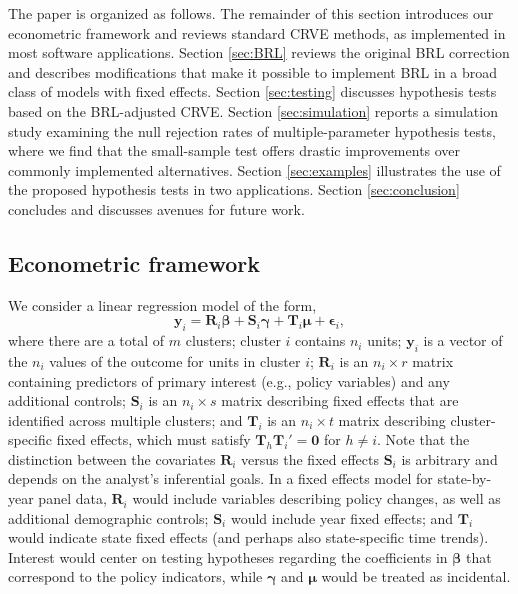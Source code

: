 \documentclass[12pt]{article}
\begin{document}
The paper is organized as follows. The remainder of this section
introduces our econometric framework and reviews standard CRVE methods,
as implemented in most software applications. Section \ref{sec:BRL}
reviews the original BRL correction and describes modifications that
make it possible to implement BRL in a broad class of models with fixed
effects. Section \ref{sec:testing} discusses hypothesis tests based on
the BRL-adjusted CRVE. Section \ref{sec:simulation} reports a simulation
study examining the null rejection rates of multiple-parameter
hypothesis tests, where we find that the small-sample test offers
drastic improvements over commonly implemented alternatives. Section
\ref{sec:examples} illustrates the use of the proposed hypothesis tests
in two applications. Section \ref{sec:conclusion} concludes and
discusses avenues for future work.

\hypertarget{econometric-framework}{%
\subsection{Econometric framework}\label{econometric-framework}}

We consider a linear regression model of the form, \begin{equation}
\label{eq:fixed_effects}
\mathbf{y}_i = \mathbf{R}_i \boldsymbol\beta + \mathbf{S}_i \boldsymbol\gamma + \mathbf{T}_i \boldsymbol\mu + \boldsymbol\epsilon_i,
\end{equation} where there are a total of \(m\) clusters; cluster \(i\)
contains \(n_i\) units; \(\mathbf{y}_i\) is a vector of the \(n_i\)
values of the outcome for units in cluster \(i\); \(\mathbf{R}_i\) is an
\(n_i \times r\) matrix containing predictors of primary interest (e.g.,
policy variables) and any additional controls; \(\mathbf{S}_i\) is an
\(n_i \times s\) matrix describing fixed effects that are identified
across multiple clusters; and \(\mathbf{T}_i\) is an \(n_i \times t\)
matrix describing cluster-specific fixed effects, which must satisfy
\(\mathbf{T}_h \mathbf{T}_i' = \mathbf{0}\) for \(h \neq i\). Note that
the distinction between the covariates \(\mathbf{R}_i\) versus the fixed
effects \(\mathbf{S}_i\) is arbitrary and depends on the analyst's
inferential goals. In a fixed effects model for state-by-year panel
data, \(\mathbf{R}_i\) would include variables describing policy
changes, as well as additional demographic controls; \(\mathbf{S}_i\)
would include year fixed effects; and \(\mathbf{T}_i\) would indicate
state fixed effects (and perhaps also state-specific time trends).
Interest would center on testing hypotheses regarding the coefficients
in \(\boldsymbol\beta\) that correspond to the policy indicators, while
\(\boldsymbol\gamma\) and \(\boldsymbol\mu\) would be treated as
incidental.
\end{document}
